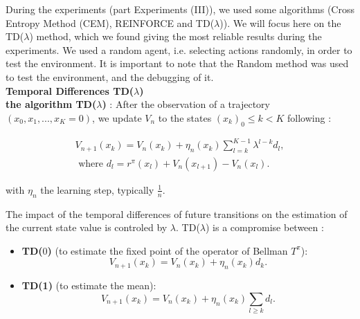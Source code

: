 \documentclass[conference]{IEEEtran}
\begin{document}
During the experiments (part Experiments (III)), we used some algorithms (Cross Entropy Method (CEM), REINFORCE and TD($\lambda$)). 
We will focus here on the TD($\lambda$) method, which we found giving the most reliable results during the experiments. 
We used a random agent, i.e. selecting actions randomly, in order to test the environment.
It is important to note that the Random method was used to test the environment, and the debugging of it.
\\
\textbf{Temporal Differences TD($\lambda$)}
\\
	

\textbf{the algorithm TD($\lambda$)} \cite{sutton1988learning}: %
 After the observation of a trajectory $(x_0,x_1,...,x_K = 0)$, we update $V_n$	 to the states $(x_k)_0 \leqslant k<K$ following :



\begin{eqnarray*}
V_{n+1}(x_k) = V_n(x_k) + \eta_n(x_k)\sum_{l=k}^{K-1}\lambda^{l-k}d_l,\\ 
\mbox{ where } d_l = r^{\pi}(x_l) + V_n(x_{l+1})-V_n(x_l).
\end{eqnarray*}

with $\eta_n$ the learning step, typically $\frac{1}{n}$.

The impact of the temporal differences of future transitions on the estimation of the current state value is controled by $\lambda$. TD($\lambda$) is a compromise between : 
\begin{itemize}
 \item \textbf{TD($0$)} (to estimate the fixed point of the operator of Bellman $T^{\pi}$): 
 \begin{equation*}
  V_{n+1}(x_k) = V_n(x_k) + \eta_n(x_k)d_k. 
 \end{equation*}
 \item \textbf{TD(1)} (to estimate the mean): 
 \begin{equation*} 
 V_{n+1}(x_k) = V_n(x_k) + \eta_n(x_k)\sum_{l\geqslant k}d_l. 
 \end{equation*} 
\end{itemize}

\end{document}
